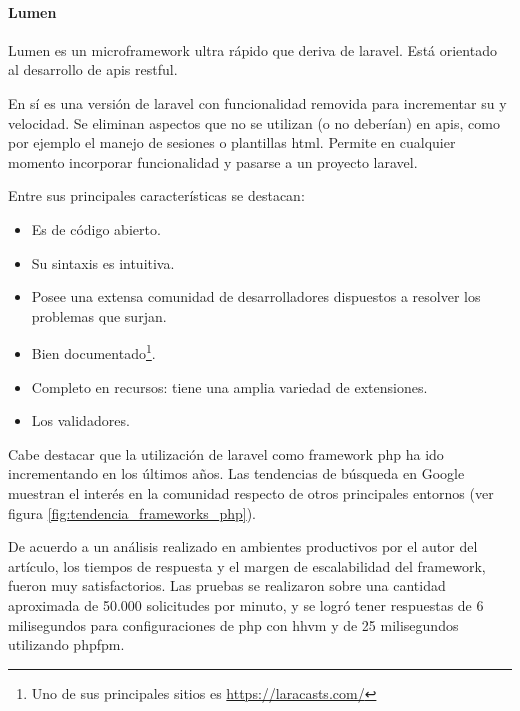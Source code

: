 \paragraph{Lumen}

Lumen es un \gls{microframework} ultra rápido que deriva de \gls{laravel}. Está orientado al desarrollo de \glspl{api} \gls{restful}. 

En sí es una versión de \gls{laravel} con funcionalidad removida para incrementar su  y velocidad. Se eliminan aspectos que no se utilizan (o no deberían) en \glspl{api}, como por ejemplo el manejo de sesiones o plantillas \gls{html}. Permite en cualquier momento incorporar funcionalidad y pasarse a un proyecto \gls{laravel}.

Entre sus principales características se destacan:
\begin{itemize}
\item Es de código abierto.
\item Su sintaxis es intuitiva.
\item Posee una extensa comunidad de desarrolladores dispuestos a resolver los problemas que surjan.
\item Bien documentado\footnote{Uno de sus principales sitios es \url{https://laracasts.com/}}.
\item Completo en recursos: tiene una amplia variedad de extensiones.
\item Los validadores.
\end{itemize}

Cabe destacar que la utilización de \gls{laravel} como \gls{framework} \gls{php} ha ido incrementando en los últimos años. Las tendencias de búsqueda en Google muestran el interés en la comunidad\cite{google2017tendenciaFramework} respecto de otros principales entornos (ver figura \ref{fig:tendencia_frameworks_php}).


De acuerdo a un análisis realizado en ambientes productivos por el autor del artículo\cite{biler2015performance}, los tiempos de respuesta y el margen de escalabilidad del \gls{framework}, fueron muy satisfactorios. Las pruebas se realizaron sobre una cantidad aproximada de 50.000 solicitudes por minuto, y se logró tener respuestas de 6 milisegundos para configuraciones de \gls{php} con \gls{hhvm} y de 25 milisegundos utilizando \gls{phpfpm}.

